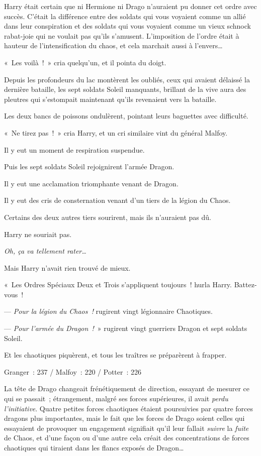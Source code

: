 Harry était certain que ni Hermione ni Drago n'auraient pu donner cet ordre avec succès. C'était la différence entre des soldats qui vous voyaient comme un allié dans leur conspiration et des soldats qui vous voyaient comme un vieux schnock rabat-joie qui ne voulait pas qu'ils s'amusent. L'imposition de l'ordre était à hauteur de l'intensification du chaos, et cela marchait aussi à l'envers…

«~Les voilà~!~» cria quelqu'un, et il pointa du doigt.

Depuis les profondeurs du lac montèrent les oubliés, ceux qui avaient délaissé la dernière bataille, les sept soldats Soleil manquants, brillant de la vive aura des pleutres qui s'estompait maintenant qu'ils revenaient vers la bataille.

Les deux bancs de poissons ondulèrent, pointant leurs baguettes avec difficulté.

«~Ne tirez pas~!~» cria Harry, et un cri similaire vint du général Malfoy.

Il y eut un moment de respiration suspendue.

Puis les sept soldats Soleil rejoignirent l'armée Dragon.

Il y eut une acclamation triomphante venant de Dragon.

Il y eut des cris de consternation venant d'un tiers de la légion du Chaos.

Certains des deux autres tiers sourirent, mais ils n'auraient pas dû.

Harry ne souriait pas.

\emph{Oh, ça va tellement rater…}

Mais Harry n'avait rien trouvé de mieux.

«~Les Ordres Spéciaux Deux et Trois s'appliquent toujours~! hurla Harry. Battez-vous~!

--- \emph{Pour la légion du Chaos~!} rugirent vingt légionnaire Chaotiques.

--- \emph{Pour l'armée du Dragon~!}~» rugirent vingt guerriers Dragon et sept soldats Soleil.

Et les chaotiques piquèrent, et tous les traîtres se préparèrent à frapper.

Granger~: 237 / Malfoy~: 220 / Potter~: 226

\later

La tête de Drago changeait frénétiquement de direction, essayant de mesurer ce qui se passait~; étrangement, malgré ses forces supérieures, il avait \emph{perdu l'initiative}. Quatre petites forces chaotiques étaient poursuivies par quatre forces dragons plus importantes, mais le fait que les forces de Drago soient celles qui essayaient de provoquer un engagement signifiait qu'il leur fallait \emph{suivre} la \emph{fuite} de Chaos, et d'une façon ou d'une autre cela créait des concentrations de forces chaotiques qui tiraient dans les flancs exposés de Dragon…

